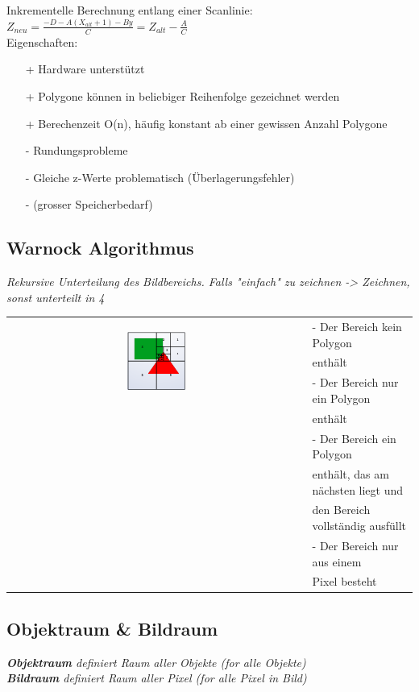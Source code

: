 Inkrementelle Berechnung entlang einer Scanlinie:\\
$Z_{neu} = \frac{-D -A(X_{alt} + 1) - By}{C} = Z_{alt} - \frac{A}{C}$ \\

Eigenschaften:
\begin{itemize}
  \item[+] Hardware unterstützt
  \item[+] Polygone können in beliebiger Reihenfolge gezeichnet werden
  \item[+] Berechenzeit O(n), häufig konstant ab einer gewissen Anzahl Polygone
  \item[-] Rundungsprobleme
  \item[-] Gleiche z-Werte problematisch (Überlagerungsfehler)
  \item[-] (grosser Speicherbedarf)
\end{itemize}

\subsection{Warnock Algorithmus}
\textit{Rekursive Unterteilung des Bildbereichs. Falls "einfach" zu zeichnen -> Zeichnen, sonst unterteilt in 4}\\

\begin{tabular}{cl}
  \multirow{3}{*}{
    \includegraphics[width=0.2\textwidth]{assets/warnock-alg.png}
  } & - Der Bereich kein Polygon \\
  & enthält \\
  & - Der Bereich nur ein Polygon \\
  & enthält \\
  & - Der Bereich ein Polygon \\
  & enthält, das am nächsten liegt und \\
  & den Bereich vollständig ausfüllt \\
  & - Der Bereich nur aus einem \\
  & Pixel besteht \\
\end{tabular}

\subsection{Objektraum \& Bildraum}

\textit{\textbf{Objektraum} definiert Raum aller Objekte (for alle Objekte)}\\
\textit{\textbf{Bildraum} definiert Raum aller Pixel (for alle Pixel in Bild)}
